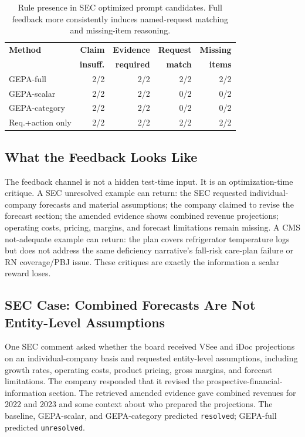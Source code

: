 \documentclass[11pt]{article}
\begin{document}
\begin{table}[t]
\centering
\scriptsize
\setlength{\tabcolsep}{3pt}
\begin{tabular}{lrrrr}
\toprule
\textbf{Method} & \textbf{Claim} & \textbf{Evidence} & \textbf{Request} & \textbf{Missing} \\
 & \textbf{insuff.} & \textbf{required} & \textbf{match} & \textbf{items} \\
\midrule
GEPA-full & 2/2 & 2/2 & 2/2 & 2/2 \\
GEPA-scalar & 2/2 & 2/2 & 0/2 & 0/2 \\
GEPA-category & 2/2 & 2/2 & 0/2 & 0/2 \\
Req.+action only & 2/2 & 2/2 & 2/2 & 2/2 \\
\bottomrule
\end{tabular}
\caption{Rule presence in SEC optimized prompt candidates. Full feedback more consistently induces named-request matching and missing-item reasoning.}
\label{tab:prompt}
\end{table}

\subsection{What the Feedback Looks Like}

The feedback channel is not a hidden test-time input. It is an optimization-time critique. A SEC unresolved example can return: the SEC requested individual-company forecasts and material assumptions; the company claimed to revise the forecast section; the amended evidence shows combined revenue projections; operating costs, pricing, margins, and forecast limitations remain missing. A CMS not-adequate example can return: the plan covers refrigerator temperature logs but does not address the same deficiency narrative's fall-risk care-plan failure or RN coverage/PBJ issue. These critiques are exactly the information a scalar reward loses.

\subsection{SEC Case: Combined Forecasts Are Not Entity-Level Assumptions}

One SEC comment asked whether the board received VSee and iDoc projections on an individual-company basis and requested entity-level assumptions, including growth rates, operating costs, product pricing, gross margins, and forecast limitations. The company responded that it revised the prospective-financial-information section. The retrieved amended evidence gave combined revenues for 2022 and 2023 and some context about who prepared the projections. The baseline, GEPA-scalar, and GEPA-category predicted \texttt{resolved}; GEPA-full predicted \texttt{unresolved}.
\end{document}
